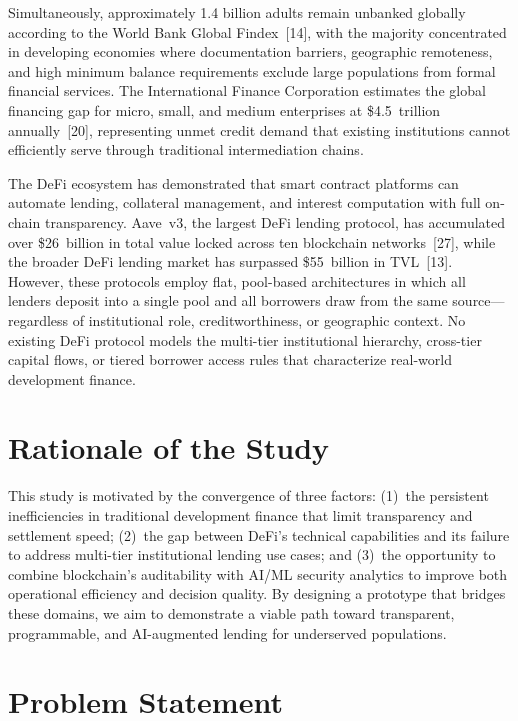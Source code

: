 \documentclass[12pt,a4paper]{report}
\begin{document}
Simultaneously, approximately 1.4 billion adults remain unbanked globally according to the World Bank Global Findex~[14], with the majority concentrated in developing economies where documentation barriers, geographic remoteness, and high minimum balance requirements exclude large populations from formal financial services. The International Finance Corporation estimates the global financing gap for micro, small, and medium enterprises at \$4.5~trillion annually~[20], representing unmet credit demand that existing institutions cannot efficiently serve through traditional intermediation chains.

The DeFi ecosystem has demonstrated that smart contract platforms can automate lending, collateral management, and interest computation with full on-chain transparency. Aave~v3, the largest DeFi lending protocol, has accumulated over \$26~billion in total value locked across ten blockchain networks~[27], while the broader DeFi lending market has surpassed \$55~billion in TVL~[13]. However, these protocols employ flat, pool-based architectures in which all lenders deposit into a single pool and all borrowers draw from the same source---regardless of institutional role, creditworthiness, or geographic context. No existing DeFi protocol models the multi-tier institutional hierarchy, cross-tier capital flows, or tiered borrower access rules that characterize real-world development finance.

\section{Rationale of the Study}

This study is motivated by the convergence of three factors: (1)~the persistent inefficiencies in traditional development finance that limit transparency and settlement speed; (2)~the gap between DeFi's technical capabilities and its failure to address multi-tier institutional lending use cases; and (3)~the opportunity to combine blockchain's auditability with AI/ML security analytics to improve both operational efficiency and decision quality. By designing a prototype that bridges these domains, we aim to demonstrate a viable path toward transparent, programmable, and AI-augmented lending for underserved populations.

\section{Problem Statement}
\end{document}

